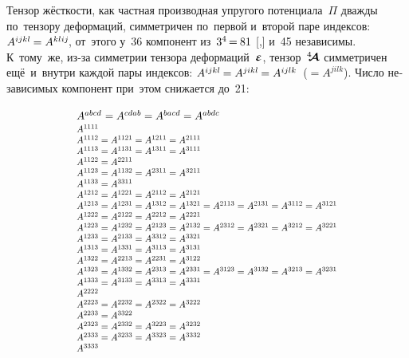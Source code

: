 \begin{otherlanguage}{russian}
\vspace{-0.1em} Тензор жёсткости, как частная производная упругого потенциала~$\Pi$ дважды по~тензору деформаций, симметричен по~первой и~второй паре индексов: ${A^{ijkl} \hspace{-0.16ex} = A^{klij}\hspace{-0.25ex}}$, от~этого у~36 компонент из~${3^4 \hspace{-0.24ex}=\hspace{-0.12ex} 81}$ [,] и~45 независимы. К~тому~же, из\hbox{-}за симметрии тензора деформаций~$\mathboldepsilon$, тензор~$\hspace{.08ex}{^4\hspace{-0.72ex}\bm{\mathcal{A}}}\hspace{.08ex}$ симметричен ещё~и~внутри каждой пары индексов: ${A^{ijkl} \hspace{-0.16ex} = A^{jikl} \hspace{-0.16ex} = A^{ijlk}}$~(${= A^{jilk}}$). Число независимых компонент при~этом снижается до~21:

\nopagebreak\vspace{-0.2em}\begin{equation*}\scalebox{0.82}{$\begin{array}{l}
\scalebox{1.16}{$A^{abcd^{\mathstrut}} = A^{cdab} = A^{bacd} = A^{abdc}$} \\[0.2em]
%
A^{1111} \\
A^{1112} = A^{1121} = A^{1211} = A^{2111} \\
A^{1113} = A^{1131} = A^{1311} = A^{3111} \\
A^{1122} = A^{2211} \\
A^{1123} = A^{1132} = A^{2311} = A^{3211} \\
A^{1133} = A^{3311} \\
A^{1212} = A^{1221} = A^{2112} = A^{2121} \\
A^{1213} = A^{1231} = A^{1312} = A^{1321} = A^{2113} = A^{2131} = A^{3112} = A^{3121} \\
A^{1222} = A^{2122} = A^{2212} = A^{2221} \\
A^{1223} = A^{1232} = A^{2123} = A^{2132} = A^{2312} = A^{2321} = A^{3212} = A^{3221} \\
A^{1233} = A^{2133} = A^{3312} = A^{3321} \\
A^{1313} = A^{1331} = A^{3113} = A^{3131} \\
A^{1322} = A^{2213} = A^{2231} = A^{3122} \\
A^{1323} = A^{1332} = A^{2313} = A^{2331} = A^{3123} = A^{3132} = A^{3213} = A^{3231} \\
A^{1333} = A^{3133} = A^{3313} = A^{3331} \\
A^{2222} \\
A^{2223} = A^{2232} = A^{2322} = A^{3222} \\
A^{2233} = A^{3322} \\
A^{2323} = A^{2332} = A^{3223} = A^{3232} \\
A^{2333} = A^{3233} = A^{3323} = A^{3332} \\
A^{3333} \\
\end{array}$}
\end{equation*}


\end{otherlanguage}
